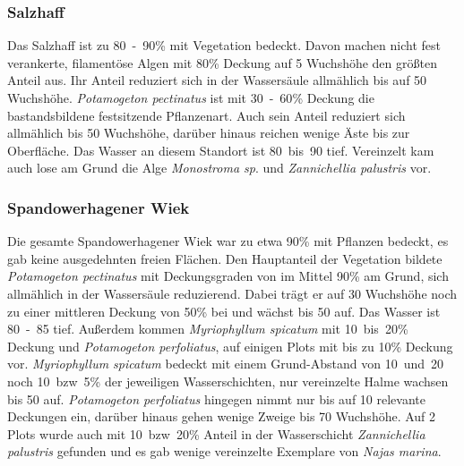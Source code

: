 \subsubsection{Salzhaff}

Das Salzhaff ist zu \unit{80-90}{\%} mit Vegetation bedeckt. Davon machen nicht fest verankerte, filamentöse Algen mit \unit{80}{\%} Deckung auf \unit{5}{\centi\metre} Wuchshöhe den größten Anteil aus. Ihr Anteil reduziert sich in der Wassersäule allmählich bis auf \unit{50}{\centi\metre} Wuchshöhe. \textit{Potamogeton pectinatus} ist mit \unit{30-60}{\%} Deckung die bastandsbildene festsitzende Pflanzenart. Auch sein Anteil reduziert sich allmählich bis \unit{50}{\centi\metre} Wuchshöhe, darüber hinaus reichen wenige Äste bis zur Oberfläche. Das Wasser an diesem Standort ist \unit{80 bis 90}{\centi\metre} tief. Vereinzelt kam auch lose am Grund die Alge \textit{Monostroma sp}. und \textit{Zannichellia palustris} vor.

\subsubsection{Spandowerhagener Wiek}

Die gesamte Spandowerhagener Wiek war zu etwa \unit{90}{\%} mit Pflanzen bedeckt, es gab keine ausgedehnten freien Flächen. Den Hauptanteil der Vegetation bildete \textit{Potamogeton pectinatus} mit Deckungsgraden von im Mittel \unit{90}{\%} am Grund, sich allmählich in der Wassersäule reduzierend. Dabei trägt er auf \unit{30}{\centi\metre} Wuchshöhe noch zu einer mittleren Deckung von \unit{50}{\%} bei und wächst bis \unit{50}{\centi\metre} auf. Das Wasser ist \unit{80-85}{\centi\metre} tief. Außerdem kommen \textit{Myriophyllum spicatum} mit \unit{10 bis 20}{\%} Deckung und \textit{Potamogeton perfoliatus}, auf einigen Plots mit bis zu \unit{10}{\%} Deckung vor. \textit{Myriophyllum spicatum} bedeckt mit einem Grund-Abstand von \unit{10 und 20}{\centi\metre} noch \unit{10 bzw. 5}{\%} der jeweiligen Wasserschichten, nur vereinzelte Halme wachsen bis \unit{50}{\centi\metre} auf. \textit{Potamogeton perfoliatus} hingegen nimmt nur bis auf \unit{10}{\centi\metre} relevante Deckungen ein, darüber hinaus gehen wenige Zweige bis \unit{70}{\centi\metre} Wuchshöhe. Auf 2 Plots wurde auch mit \unit{10 bzw. 20}{\%} Anteil in der Wasserschicht \textit{Zannichellia palustris} gefunden und es gab wenige vereinzelte Exemplare von \textit{Najas marina}.






